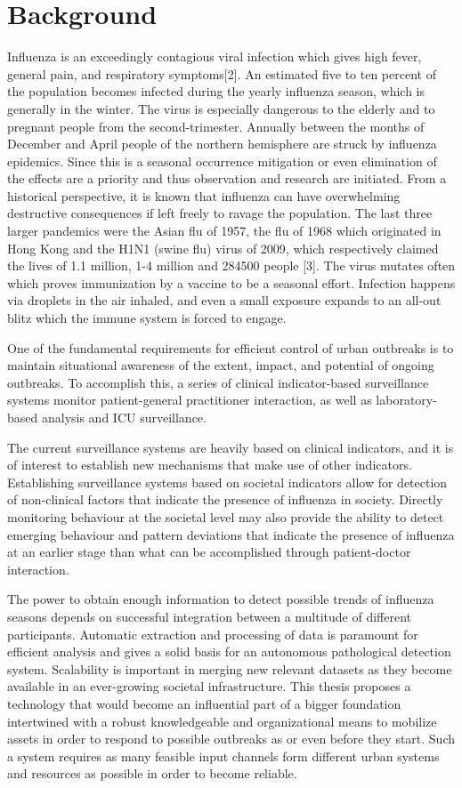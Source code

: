 \section{Background}
Influenza is an exceedingly contagious viral infection which gives high fever, general pain, and respiratory symptoms[2]. An estimated five to ten percent of the population becomes infected during the yearly influenza season, which is generally in the winter. The virus is especially dangerous to the elderly and to pregnant people from the second-trimester. Annually between the months of December and April people of the northern hemisphere are struck by influenza epidemics. Since this is a seasonal occurrence mitigation or even elimination of the effects are a priority and thus observation and research are initiated. From a historical perspective, it is known that influenza can have overwhelming destructive consequences if left freely to ravage the population. The last three larger pandemics were the Asian flu of 1957, the flu of 1968 which originated in Hong Kong and the H1N1 (swine flu) virus of 2009, which respectively claimed the lives of 1.1 million, 1-4 million and 284500 people [3]. The virus mutates often which proves immunization by a vaccine to be a seasonal effort. Infection happens via droplets in the air inhaled, and even a small exposure expands to an all-out blitz which the immune system is forced to engage.

One of the fundamental requirements for efficient control of urban outbreaks is to maintain situational awareness of the extent, impact, and potential of ongoing outbreaks. To accomplish this, a series of clinical indicator-based surveillance systems monitor patient-general practitioner interaction, as well as laboratory-based analysis and ICU surveillance. 

The current surveillance systems are heavily based on clinical indicators, and it is of interest to establish new mechanisms that make use of other indicators. Establishing surveillance systems based on societal indicators allow for detection of non-clinical factors that indicate the presence of influenza in society. Directly monitoring behaviour at the societal level may also provide the ability to detect emerging behaviour and pattern deviations that indicate the presence of influenza at an earlier stage than what can be accomplished through patient-doctor interaction.

 The power to obtain enough information to detect possible trends of influenza seasons depends on successful integration between a multitude of different participants. Automatic extraction and processing of data is paramount for efficient analysis and gives a solid basis for an autonomous pathological detection system. Scalability is important in merging new relevant datasets as they become available in an ever-growing societal infrastructure. This thesis proposes a technology that would become an influential part of a bigger foundation intertwined with a robust knowledgeable and organizational means to mobilize assets in order to respond to possible outbreaks as or even before they start. Such a system requires as many feasible input channels form different urban systems and resources as possible in order to become reliable.

